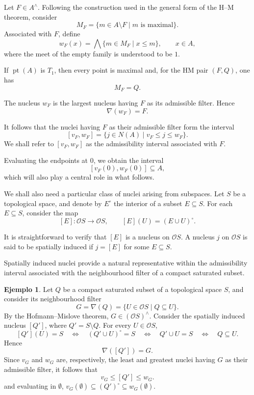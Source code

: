 \documentclass[11pt]{amsart}
\DeclareMathOperator{\pt}{pt}
\theoremstyle{plain}
\theoremstyle{definition}
\newtheorem{ej}[thm]{Ejemplo}
\begin{document}
Let \(F\in A^\wedge\). Following the construction used in the general form of the H--M theorem, consider
\[
M_F=\{m\in A\setminus F\mid m\text{ is maximal}\}.
\]
Associated with \(F\), define
\[
w_F(x)=\bigwedge\{m\in M_F\mid x\leq m\},
\qquad x\in A,
\]
where the meet of the empty family is understood to be \(1\).

If \(\pt(A)\) is \(T_1\), then every point is maximal and, for the HM pair \((F,Q)\), one has
\[
M_F=Q.
\]

The nucleus \(w_F\) is the largest nucleus having \(F\) as its admissible filter. Hence
\[
\nabla(w_F)=F.
\]

It follows that the nuclei having \(F\) as their admissible filter form the interval
\[
[v_F,w_F]
=
\{j\in N(A)\mid v_F\leq j\leq w_F\}.
\]
We shall refer to \([v_F,w_F]\) as the admissibility interval associated with \(F\).

Evaluating the endpoints at \(0\), we obtain the interval
\[
[v_F(0),w_F(0)]\subseteq A,
\]
which will also play a central role in what follows.

We shall also need a particular class of nuclei arising from subspaces. Let \(S\) be a topological space, and denote by \(E^\circ\) the interior of a subset \(E\subseteq S\). For each \(E\subseteq S\), consider the map
\[
[E]\colon\mathcal O S\longrightarrow\mathcal O S,\qquad
[E](U)=(E\cup U)^\circ.
\]

It is straightforward to verify that \([E]\) is a nucleus on \(\mathcal O S\). 
A nucleus \(j\) on \(\mathcal O S\) is said to be spatially induced if \(j=[E]\) for some \(E\subseteq S\).

Spatially induced nuclei provide a natural representative within the admissibility interval associated with the neighbourhood filter of a compact saturated subset.
\begin{ej}
	Let \(Q\) be a compact saturated subset of a topological space \(S\), and consider its neighbourhood filter
\[
G=\nabla(Q)=\{U\in\mathcal O S\mid Q\subseteq U\}.
\]
By the Hofmann--Mislove theorem, \(G\in(\mathcal O S)^\wedge\). Consider the spatially induced nucleus \([Q']\), where \(Q'=S\setminus Q\). For every \(U\in\mathcal O S\),
\[
[Q'](U)=S
\quad\Longleftrightarrow\quad
(Q'\cup U)^\circ=S
\quad\Longleftrightarrow\quad
Q'\cup U=S
\quad\Longleftrightarrow\quad
Q\subseteq U.
\]
Hence
\[
\nabla([Q'])=G.
\]
Since \(v_G\) and \(w_G\) are, respectively, the least and greatest nuclei having \(G\) as their admissible filter, it follows that
\[
v_G\leq[Q']\leq w_G.
\]
and evaluating in $\emptyset$, $v_G(\emptyset)\subseteq (Q')^\circ\subseteq w_G(\emptyset)$.
\end{ej}
\end{document}
